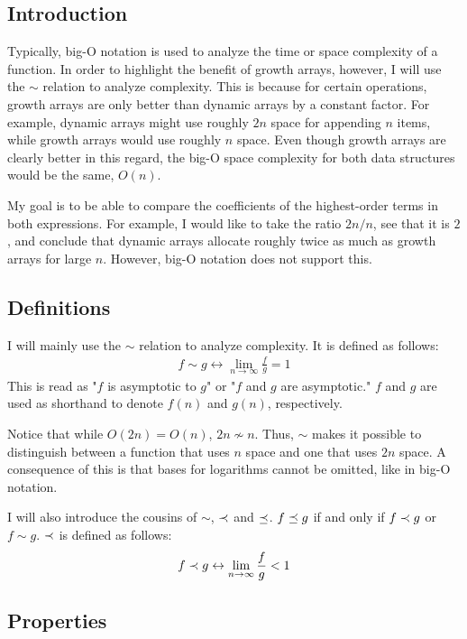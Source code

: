 \subsection{Introduction}

Typically, big-O notation is used to analyze the time or space complexity of a function. In order to highlight the benefit of growth arrays, however, I will use the $\sim$ relation to analyze complexity. This is because for certain operations, growth arrays are only better than dynamic arrays by a constant factor. For example, dynamic arrays might use roughly $2n$ space for appending $n$ items, while growth arrays would use roughly $n$ space. Even though growth arrays are clearly better in this regard, the big-O space complexity for both data structures would be the same, $O(n)$.

My goal is to be able to compare the coefficients of the highest-order terms in both expressions. For example, I would like to take the ratio $2n / n$, see that it is $2$, and conclude that dynamic arrays allocate roughly twice as much as growth arrays for large $n$. However, big-O notation does not support this.

\subsection{Definitions}

I will mainly use the $\sim$ relation to analyze complexity. It is defined as follows:
\begin{align*}
f \sim g \leftrightarrow \lim_{n \to \infty} \frac f g = 1
\end{align*}
This is read as "$f$ is asymptotic to $g$" or "$f$ and $g$ are asymptotic." {\HdrNote} $f$ and $g$ are used as shorthand to denote $f(n)$ and $g(n)$, respectively.

Notice that while $O(2n) = O(n)$, $2n \not\sim n$. Thus, $\sim$ makes it possible to distinguish between a function that uses $n$ space and one that uses $2n$ space. {\HdrNote} A consequence of this is that bases for logarithms cannot be omitted, like in big-O notation.

I will also introduce the cousins of $\sim$, $\prec$ and $\preceq$. $f \preceq g$ if and only if $f \prec g$ or $f \sim g$. $\prec$ is defined as follows:
\begin{align*}
f \prec g \leftrightarrow \lim_{n \to \infty} \frac f g < 1
\end{align*}
\subsection{Properties}
\label{subsec:AsymptoticProperties}

